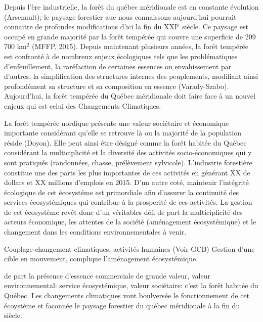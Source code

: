 

Depuis l'ère industrielle, la forêt du québec méridionale est en constante évolution (Arsenault); le paysage forestier aue nous connaissons aujourd'hui pourrait connaitre de profondes modifications d'ici la fin du XXI$^e$ siècle. Ce paysage est occupé en grande majorité par la forêt tempérée qui couvre une superficie de 209 700 km$^2$ (MFFP, 2015). Depuis maintenant plusieurs années, la forêt tempérée est confronté à de nombreux enjeux écologiques tels que les problématiques d'enfeuillement, la raréfaction de certaines essences ou envahissement par d’autres, la simplification des structures internes des peuplements, modifiant ainsi profondément sa structure et sa composition en essence (Varady-Szabo). Aujourd'hui, la forêt tempérée du Québec méridionale doit faire face à un nouvel enjeux qui est celui des Changements Climatiques. 

La forêt tempérée nordique présente une valeur sociétaire et économique importante considérant qu'elle se retrouve là ou la majorité de la population réside (Doyon).  Elle peut ainsi être désigné comme la forêt habitée du Québec considérant la multiciplicité et la diversité des activités socio-économiques qui y sont pratiqués (randonnées, chasse, prélèvement sylvicole). L'industrie forestière constitue une des parts les plus importantes de ces activités en générant XX de dollars et XX millions d'emplois en 2015. D'un autre coté, maintenir l'intégrité écologique de cet écosystéme est primordiale afin d'assurer la continuité des services écosystémiques qui contribue à la prosperité de ces activités.
La gestion de cet écosystème revêt donc d'un véritables défi de part la multiciplicité des acteurs économique, les attentes de la société (aménagement écosystémique) et le changement dans les conditions environnementales à venir. 

Couplage changement climatiques, activités humaines (Voir GCB)
Gestion d'une cible en mouvement, complique l'aménagement écosystémique.

de part la présence d'essence commerciale de grande valeur, valeur environnemental: service écosystémique, valeur sociétaire: c'est la forêt habitée du Québec. Les changements climatiques vont boulversée le fonctionnement de cet écoystème et faconnée le paysage forestier du québec méridionale à la fin du siècle.

